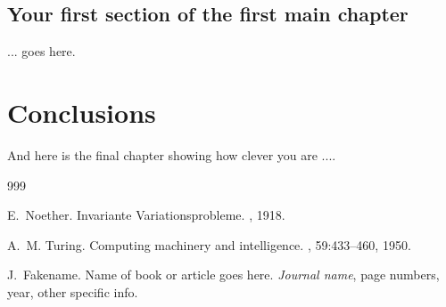 \documentclass[12pt, a4paper,twoside]{report}
\theoremstyle{plain} %
\theoremstyle{definition} %
\theoremstyle{remark} %
\numberwithin{equation}{chapter}
\begin{document}
\section{Your first section of the first main chapter}\label{sec:2.1}

... goes here.



\chapter{Conclusions}\label{ch:concl}

And here is the final chapter showing how clever you are ....




\begin{thebibliography}{999} %


E.~Noether.
\newblock Invariante {V}ariationsprobleme.
, 1918.

A.~M. Turing.
\newblock Computing machinery and intelligence.
, 59:433--460, 1950.

J.~Fakename.
\newblock Name of book or article goes here.
\newblock \emph{Journal name}, page numbers, year, other specific info.

\end{thebibliography}
\end{document}
